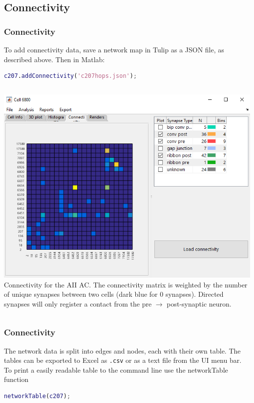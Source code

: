 \documentclass[11pt]{beamer}
\begin{document}
\subsection{Connectivity}
\begin{frame}[fragile]
	\frametitle{Connectivity}
	To add connectivity data, save a network map in Tulip as a JSON file, as described above. Then in Matlab:
	\begin{lstlisting}[language=matlab]
c207.addConnectivity('c207hops.json');\end{lstlisting}
	\vskip10pt
	\begin{columns}
		\includegraphics[height=0.4\textheight]{c6800_network}	
		\vskip10pt
		Connectivity for the AII AC.
		The connectivity matrix is weighted by the number of unique synapses between two cells (dark blue for 0 synapses). Directed synapses will only register a contact from the pre $\rightarrow$ post-synaptic neuron.
	\end{columns}
\end{frame}
\begin{frame}[fragile]
	\frametitle{Connectivity}
	The network data is split into edges and nodes, each with their own table. The tables can be exported to Excel as \texttt{.csv} or as a text file from the UI menu bar.\\
	\vskip10pt
	To print a easily readable table to the command line use the networkTable function
\begin{lstlisting}[language=matlab]
networkTable(c207);\end{lstlisting}
\end{frame}
\end{document}
